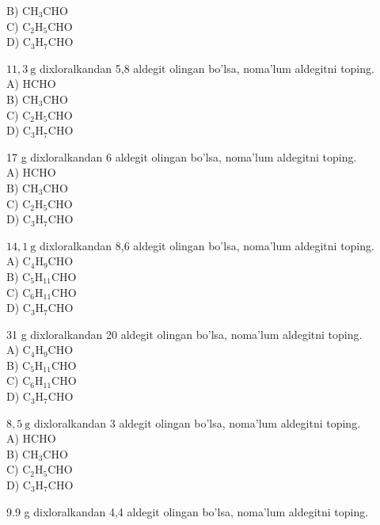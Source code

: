 B) $\mathrm{CH}_{3} \mathrm{CHO}$\\
C) $\mathrm{C}_{2} \mathrm{H}_{5} \mathrm{CHO}$\\
D) $\mathrm{C}_{3} \mathrm{H}_{7} \mathrm{CHO}$
  \item $11,3 \mathrm{~g}$ dixloralkandan 5,8 aldegit olingan bo'lsa, noma'lum aldegitni toping.\\
A) HCHO\\
B) $\mathrm{CH}_{3} \mathrm{CHO}$\\
C) $\mathrm{C}_{2} \mathrm{H}_{5} \mathrm{CHO}$\\
D) $\mathrm{C}_{3} \mathrm{H}_{7} \mathrm{CHO}$
  \item 17 g dixloralkandan 6 aldegit olingan bo'lsa, noma'lum aldegitni toping.\\
A) HCHO\\
B) $\mathrm{CH}_{3} \mathrm{CHO}$\\
C) $\mathrm{C}_{2} \mathrm{H}_{5} \mathrm{CHO}$\\
D) $\mathrm{C}_{3} \mathrm{H}_{7} \mathrm{CHO}$
  \item $14,1 \mathrm{~g}$ dixloralkandan 8,6 aldegit olingan bo'lsa, noma'lum aldegitni toping.\\
A) $\mathrm{C}_{4} \mathrm{H}_{9} \mathrm{CHO}$\\
B) $\mathrm{C}_{5} \mathrm{H}_{11} \mathrm{CHO}$\\
C) $\mathrm{C}_{6} \mathrm{H}_{11} \mathrm{CHO}$\\
D) $\mathrm{C}_{3} \mathrm{H}_{7} \mathrm{CHO}$
  \item 31 g dixloralkandan 20 aldegit olingan bo'lsa, noma'lum aldegitni toping.\\
A) $\mathrm{C}_{4} \mathrm{H}_{9} \mathrm{CHO}$\\
B) $\mathrm{C}_{5} \mathrm{H}_{11} \mathrm{CHO}$\\
C) $\mathrm{C}_{6} \mathrm{H}_{11} \mathrm{CHO}$\\
D) $\mathrm{C}_{3} \mathrm{H}_{7} \mathrm{CHO}$
  \item $8,5 \mathrm{~g}$ dixloralkandan 3 aldegit olingan bo'lsa, noma'lum aldegitni toping.\\
A) HCHO\\
B) $\mathrm{CH}_{3} \mathrm{CHO}$\\
C) $\mathrm{C}_{2} \mathrm{H}_{5} \mathrm{CHO}$\\
D) $\mathrm{C}_{3} \mathrm{H}_{7} \mathrm{CHO}$
  \item 9.9 g dixloralkandan 4,4 aldegit olingan bo'lsa, noma'lum aldegitni toping.\\
